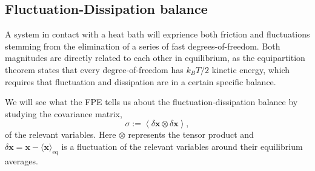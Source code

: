 \documentclass[ twoside,openright,titlepage,numbers=noenddot,%
headinclude,footinclude,cleardoublepage=empty,abstract=on,
BCOR=5mm,paper=a4,fontsize=11pt, dvipsnames
]{scrreprt}
\renewcommand{\vec}[1]{\bm{#1}}
\newcommand{\tens}[1]{\bm{\mathcal{#1}}}
\newcommand{\kT}{k_B T}
\begin{document}
\subsection{Fluctuation-Dissipation balance}\label{sec:fdb}
A system in contact with a heat bath will exprience both friction and fluctuations stemming from the elimination of a series of fast degrees-of-freedom. Both magnitudes are directly related to each other in equilibrium, as the equipartition theorem states that every degree-of-freedom has $\kT/2$ kinetic energy, which requires that fluctuation and dissipation are in a certain specific balance.

We will see what the \gls{FPE} tells us about the fluctuation-dissipation balance by studying the covariance matrix,
\begin{equation}
\tens{\sigma} :=\left\langle \delta\vec{x}\otimes\delta\vec{x}\right\rangle,
\end{equation}
of the relevant variables. Here $\otimes$ represents the tensor product and $\delta\vec{x} = \vec{x} - \langle\vec{x}\rangle_{\text{eq}}$ is a fluctuation of the relevant variables around their equilibrium averages.
\end{document}
